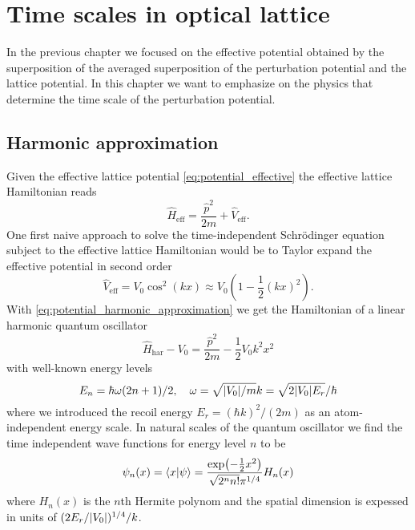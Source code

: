 \chapter{Time scales in optical lattice}

In the previous chapter we focused on the effective potential obtained by the
superposition of the averaged superposition of the perturbation potential and
the lattice potential. In this chapter we want to emphasize on the physics
that determine the time scale of the perturbation potential.

\section{Harmonic approximation}

Given the effective lattice potential \cref{eq:potential_effective} the
effective lattice Hamiltonian reads
\begin{equation}
  \hat{H}_\text{eff}
  =\frac{\hat{p}^2}{2m}+\hat{V}_\text{eff}
  \label{eq:hamiltonian_effective}.
\end{equation}
One first naive approach to solve the time-independent Schrödinger equation
subject to the effective lattice Hamiltonian would be to Taylor expand
the effective potential in second order
\begin{equation}
  \hat{V}_\text{eff}
  =V_0\cos^2(kx)
  \approx V_0\left(1-\frac{1}{2}(kx)^2\right)
  \label{eq:potential_harmonic_approximation}.
\end{equation}
With \cref{eq:potential_harmonic_approximation} we get the Hamiltonian of a
linear harmonic quantum oscillator
\begin{equation}
  \hat{H}_\text{har}-V_0
  =\frac{\hat{p}^2}{2m}-\frac{1}{2}V_0k^2x^2
  \label{eq:hamiltonian_harmonic_approximation}
\end{equation}
with well-known energy levels
\begin{equation}
  E_n=\hbar\omega(2n+1)/2
  \qc
  \omega=\sqrt{\abs{V_0}/m}k=\sqrt{2\abs{V_0}E_r}/\hbar
  \label{eq:energy_harmonic_approximation}
\end{equation}
where we introduced the recoil energy $E_r=(\hbar k)^2/(2m)$ as an
atom-independent energy scale. In natural scales of the quantum oscillator
we find the time independent wave functions for energy level $n$ to be
\begin{equation}
  \psi_n(x)
  =
  \bra{x}\ket{\psi}
  =
  \frac{\exp(-\frac{1}{2}x^2)}{\sqrt{2^nn!}\pi^{1/4}}H_n(x)
  \label{eq:wavefunction_harmonic}
\end{equation}
where $H_n(x)$ is the $n$th Hermite polynom and the spatial dimension is
expessed in units of $(2E_r/\abs{V_0})^{1/4}/k$.


